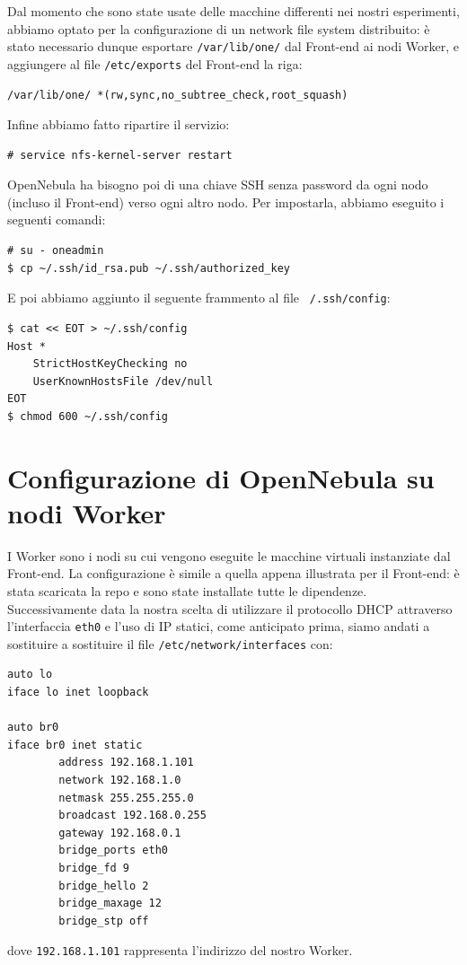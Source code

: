 \documentclass[twoside]{article}
\begin{document}
Dal momento che sono state usate delle macchine differenti nei nostri esperimenti, abbiamo optato
per la configurazione di un network file system distribuito: è stato necessario dunque esportare
\texttt{/var/lib/one/} dal Front-end ai nodi Worker, e aggiungere al file \texttt{/etc/exports}
del Front-end la riga:
\begin{lstlisting}[frame=trBL]
/var/lib/one/ *(rw,sync,no_subtree_check,root_squash)
\end{lstlisting}

Infine abbiamo fatto ripartire il servizio:
\begin{lstlisting}[frame=trBL]
# service nfs-kernel-server restart
\end{lstlisting}

OpenNebula ha bisogno poi di una chiave SSH senza password da ogni nodo (incluso il Front-end)
verso ogni altro nodo. Per impostarla, abbiamo eseguito i seguenti comandi:
\begin{lstlisting}[frame=trBL]
# su - oneadmin
$ cp ~/.ssh/id_rsa.pub ~/.ssh/authorized_key
\end{lstlisting}

E poi abbiamo aggiunto il seguente frammento al file \texttt{~/.ssh/config}:
\begin{lstlisting}[frame=trBL]
$ cat << EOT > ~/.ssh/config
Host *
    StrictHostKeyChecking no
    UserKnownHostsFile /dev/null
EOT
$ chmod 600 ~/.ssh/config
\end{lstlisting}

\section{Configurazione di OpenNebula su nodi Worker}
I Worker sono i nodi su cui vengono eseguite le macchine virtuali instanziate dal Front-end.
La configurazione è simile a quella appena illustrata per il Front-end: è stata scaricata la repo
e sono state installate tutte le dipendenze. Successivamente data la nostra scelta di utilizzare
il protocollo DHCP attraverso l'interfaccia \texttt{eth0} e l'uso di IP statici, come anticipato prima,
siamo andati a sostituire a sostituire il file \texttt{/etc/network/interfaces} con:
\newpage
\begin{lstlisting}[frame=trBL]
auto lo
iface lo inet loopback

auto br0
iface br0 inet static
        address 192.168.1.101
        network 192.168.1.0
        netmask 255.255.255.0
        broadcast 192.168.0.255
        gateway 192.168.0.1
        bridge_ports eth0
        bridge_fd 9
        bridge_hello 2
        bridge_maxage 12
        bridge_stp off
\end{lstlisting}
dove \texttt{192.168.1.101} rappresenta l'indirizzo del nostro Worker.
\end{document}

